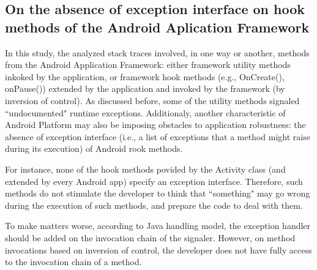 \documentclass[conference]{IEEEtran}
\begin{document}




\subsection{On the absence of exception interface on hook methods of the Android Aplication Framework}

In this study, the analyzed stack traces involved, in one way or another, methods from the 
Android Application Framework: either framework utility methods inkoked 
by the application, or framework hook methods  (e.g., OnCreate(), onPause())  
 extended by the application and invoked by the framework (by inversion of control).
 As discussed before, some of the utility 
methods signaled ``undocumented" runtime exceptions. Additionaly, another characteristic of 
Android Platform may also be imposing obstacles to application robustness: the absence 
of exception interface (i.e., a list of exceptions that a method 
might raise during its execution) of Android rook methods.

For instance, none of the hook methods povided by the Activity class (and 
extended by every Android app) specify an exception interface. Therefore, such methods
do not stimulate the developer to think that ``something" may go wrong 
during the execution of such methods, and prepare the code to deal with them.

To make matters worse, according to Java handling model, the exception handler
 should be added on the invocation chain of the signaler.  However,  on method invocations based 
on inversion of control, the developer does not have fully access to the invocation 
chain of a method. 
\end{document}

